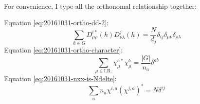 For convenience, I type all the orthonomal relationship together:

Equation \ref{eq:20161031-ortho-dd-2}:
\begin{equation*}
    \sum_{h\in G} D^{i*}_{\mu\rho}(h)D^j_{\nu \lambda}(h) =
    \frac{N}{d_j} \delta_{ij} \delta_{\mu\nu}\delta_{\rho\lambda}
\end{equation*}
Equation \ref{eq:20161031-ortho-character}:
\begin{equation*}
    \sum_{\mu \in \text{I.R.}} \chi^{a*}_\mu\chi^b_\mu = 
        \frac{|G|}{n_a} \delta^{ab}
\end{equation*}
Equation \ref{eq:20161031-nxx-is-Ndelte}:
\begin{equation*}
    \sum_a n_a \chi^{i,a}(\chi^{j,a})^* = N\delta^{ij}
\end{equation*}
